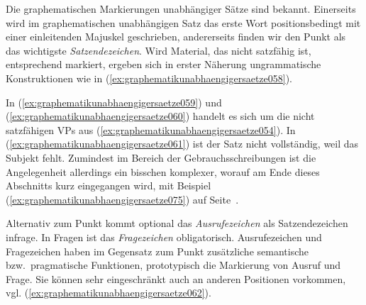 Die graphematischen Markierungen unabhängiger Sätze sind bekannt.
Einerseits wird im graphematischen unabhängigen Satz das erste Wort positionsbedingt mit einer einleitenden Majuskel geschrieben, andererseits finden wir den Punkt als das wichtigste \textit{Satzendezeichen}.
Wird Material, das nicht satzfähig ist, entsprechend markiert, ergeben sich in erster Näherung ungrammatische Konstruktionen wie in (\ref{ex:graphematikunabhaengigersaetze058}).

\begin{exe}
  \ex\label{ex:graphematikunabhaengigersaetze058}
  \begin{xlist}
  \end{xlist}
\end{exe}

In (\ref{ex:graphematikunabhaengigersaetze059}) und (\ref{ex:graphematikunabhaengigersaetze060}) handelt es sich um die nicht satzfähigen VPs aus (\ref{ex:graphematikunabhaengigersaetze054}).
In (\ref{ex:graphematikunabhaengigersaetze061}) ist der Satz nicht vollständig, weil das Subjekt fehlt.
Zumindest im Bereich der Gebrauchsschreibungen ist die Angelegenheit allerdings ein bisschen komplexer, worauf am Ende dieses Abschnitts kurz eingegangen wird, \zB mit Beispiel (\ref{ex:graphematikunabhaengigersaetze075}) auf Seite~\pageref{ex:graphematikunabhaengigersaetze075}.

Alternativ zum Punkt kommt optional das \textit{Ausrufezeichen} als Satzendezeichen infrage.
In Fragen ist das \textit{Fragezeichen} obligatorisch.
Ausrufezeichen und Fragezeichen haben im Gegensatz zum Punkt zusätzliche semantische bzw.\ pragmatische Funktionen, prototypisch die Markierung von Ausruf und Frage.
Sie können sehr eingeschränkt auch an anderen Positionen vorkommen, vgl. (\ref{ex:graphematikunabhaengigersaetze062}).

\begin{exe}
  \ex\label{ex:graphematikunabhaengigersaetze062}
  \begin{xlist}
  \end{xlist}
\end{exe}


